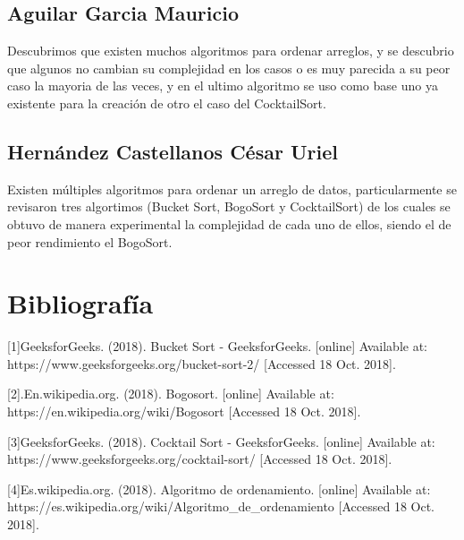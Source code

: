 \documentclass[12pt,twoside]{article}
\begin{document}
\subsection*{Aguilar Garcia Mauricio}
Descubrimos que existen muchos algoritmos para ordenar arreglos, y se descubrio que algunos no cambian su complejidad en los casos o es muy parecida a su peor caso la mayoria de las veces, y en el ultimo algoritmo se uso como base uno ya existente para la creación de otro el caso del CocktailSort.

\subsection*{Hernández Castellanos César Uriel}

Existen múltiples algoritmos para ordenar un arreglo de datos, particularmente se revisaron tres algortimos (Bucket Sort, BogoSort y CocktailSort) de los cuales se obtuvo de manera experimental la complejidad de cada uno de ellos, siendo el de peor rendimiento el BogoSort.
\section{Bibliograf\'ia}

[1]GeeksforGeeks. (2018). Bucket Sort - GeeksforGeeks. [online] Available at: https://www.geeksforgeeks.org/bucket-sort-2/ [Accessed 18 Oct. 2018].

[2].En.wikipedia.org. (2018). Bogosort. [online] Available at: https://en.wikipedia.org/wiki/Bogosort [Accessed 18 Oct. 2018].

[3]GeeksforGeeks. (2018). Cocktail Sort - GeeksforGeeks. [online] Available at: https://www.geeksforgeeks.org/cocktail-sort/ [Accessed 18 Oct. 2018].

[4]Es.wikipedia.org. (2018). Algoritmo de ordenamiento. [online] Available at: https://es.wikipedia.org/wiki/Algoritmo_de_ordenamiento [Accessed 18 Oct. 2018].
\end{document}
